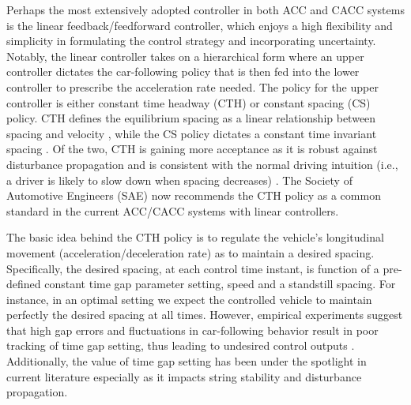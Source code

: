\documentclass{article}
\begin{document}
Perhaps the most extensively adopted controller in both ACC and CACC systems is the linear feedback/feedforward controller, which enjoys a high flexibility and simplicity in formulating the control strategy and incorporating uncertainty. Notably, the linear controller takes on a hierarchical form where an upper controller dictates the car-following policy that is then fed into the lower controller to prescribe the acceleration rate needed. The policy for the upper controller is either constant time headway (CTH) or constant spacing (CS) policy. CTH defines the equilibrium spacing as a linear relationship between spacing and velocity \cite{rajamani2001experimental}, while the CS policy dictates a constant time invariant spacing \cite{darbha1999intelligent}. Of the two, CTH is gaining more acceptance as it is robust against disturbance propagation and is consistent with the normal driving intuition (i.e., a driver is likely to slow down when spacing decreases) \cite{li2002traffic}. The Society of Automotive Engineers (SAE) now recommends the CTH policy as a common standard in the current ACC/CACC systems with linear controllers. 

The basic idea behind the CTH policy is to regulate the vehicle's longitudinal movement (acceleration/deceleration rate) as to maintain a desired spacing. Specifically, the desired spacing, at each control time instant, is function of a pre-defined constant time gap parameter setting, speed and a standstill spacing. For instance, in an optimal setting we expect the controlled vehicle to maintain perfectly the desired spacing at all times. However, empirical experiments suggest that high gap errors and fluctuations in car-following behavior result in poor tracking of time gap setting, thus leading to undesired control outputs \cite{milanes2014modeling}. Additionally, the value of time gap setting has been under the spotlight in current literature especially as it impacts string stability and disturbance propagation. 
\end{document}
